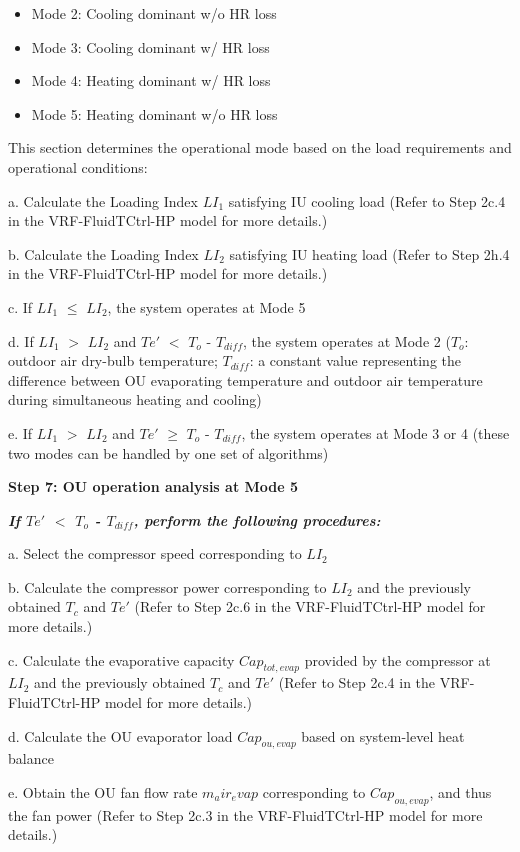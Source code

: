 \begin{itemize}
  \item
    Mode 2: Cooling dominant w/o HR loss
  \item
    Mode 3: Cooling dominant w/ HR loss
  \item
    Mode 4: Heating dominant w/ HR loss
  \item
    Mode 5: Heating dominant w/o HR loss
\end{itemize}

This section determines the operational mode based on the load requirements and operational conditions:

a. Calculate the Loading Index $LI_1$ satisfying IU cooling load (Refer to Step 2c.4 in the VRF-FluidTCtrl-HP model for more details.)

b. Calculate the Loading Index $LI_2$ satisfying IU heating load (Refer to Step 2h.4 in the VRF-FluidTCtrl-HP model for more details.)

c. If $LI_1$ $\leq$ $LI_2$, the system operates at Mode 5

d. If $LI_1$ $>$ $LI_2$ and $Te'$ $<$ $T_o$ - $T_{diff}$, the system operates at Mode 2
($T_o$: outdoor air dry-bulb temperature; $T_{diff}$: a constant value representing the difference between OU evaporating temperature and outdoor air temperature during simultaneous heating and cooling)

e. If $LI_1$ $>$ $LI_2$ and $Te'$ $\geq$  $T_o$ - $T_{diff}$, the system operates at Mode 3 or 4 (these two modes can be handled by one set of algorithms)

\textbf{Step 7: OU operation analysis at Mode 5}

\emph{\textbf{If $Te'$ $<$ $T_o$ - $T_{diff}$, perform the following procedures:}}

a. Select the compressor speed corresponding to $LI_2$

b. Calculate the compressor power corresponding to $LI_2$ and the previously obtained $T_c$ and $Te'$
(Refer to Step 2c.6 in the VRF-FluidTCtrl-HP model for more details.)

c. Calculate the evaporative capacity $Cap_{tot,evap}$ provided by the compressor at $LI_2$ and the previously obtained $T_c$ and $Te'$
(Refer to Step 2c.4 in the VRF-FluidTCtrl-HP model for more details.)

d. Calculate the OU evaporator load $Cap_{ou,evap}$ based on system-level heat balance

e. Obtain the OU fan flow rate $m_air_evap$ corresponding to $Cap_{ou,evap}$, and thus the fan power
(Refer to Step 2c.3 in the VRF-FluidTCtrl-HP model for more details.)

